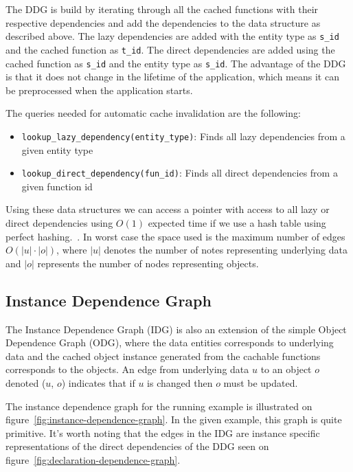 The DDG is build by iterating through all the cached functions with their respective dependencies and add the dependencies to the data structure as described above. The lazy dependencies are added with the entity type as \verb$s_id$ and the cached function as \verb$t_id$. The direct dependencies are added using the cached function as \verb$s_id$ and the entity type as \verb$s_id$.  The advantage of the DDG is that it does not change in the lifetime of the application, which means it can be preprocessed when the application starts.

The queries needed for automatic cache invalidation are the following:

\begin{itemize}
  \item \verb$lookup_lazy_dependency(entity_type)$: Finds all lazy dependencies from a given entity type
  \item \verb$lookup_direct_dependency(fun_id)$: Finds all direct dependencies from a given function id
\end{itemize}

Using these data structures we can access a pointer with access to all lazy or direct dependencies using $O(1)$ expected time if we use a hash table using perfect hashing.~\cite{paper:perfect-hashing}. In worst case the space used is the maximum number of edges $O(|u| \cdot |o|)$, where $|u|$ denotes the number of notes representing underlying data and $|o|$ represents the number of nodes representing objects.


\subsection{Instance Dependence Graph}
\label{subsec:instance-dependence-graph}

The Instance Dependence Graph (IDG) is also an extension of the simple Object Dependence Graph (ODG), where the data entities corresponds to underlying data and the cached object instance generated from the cachable functions corresponds to the objects. An edge from underlying data $u$ to an object $o$ denoted ($u$, $o$) indicates that if $u$ is changed then $o$ must be updated.

The instance dependence graph for the running example is illustrated on figure~\ref{fig:instance-dependence-graph}. In the given example, this graph is quite primitive. It's worth noting that the edges in the IDG are instance specific representations of the direct dependencies of the DDG seen on figure~\ref{fig:declaration-dependence-graph}.


